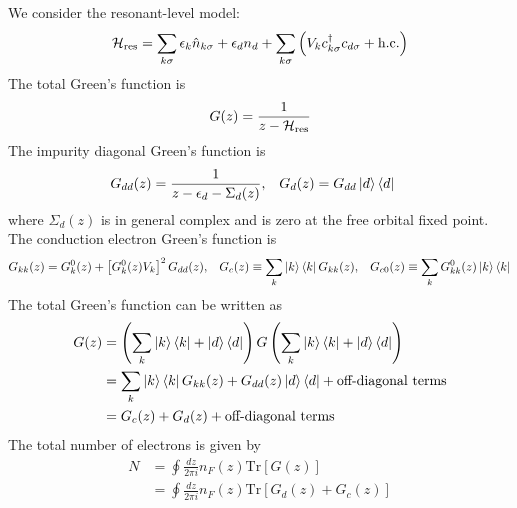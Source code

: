\documentclass[12pt,twoside]{report}
\numberwithin{equation}{section}
\begin{document}
We consider the resonant-level model:
\begin{equation}\begin{aligned}
	\mathcal{H}_\text{res} = \sum_{k\sigma}\epsilon_k \hat n_{k\sigma} + \epsilon_d n_d + \sum_{k\sigma}\left(V_k c^\dagger_{k\sigma} c_{d\sigma} + \text{h.c.}\right)
\end{aligned}\end{equation}
The total Green's function is 
\begin{equation}\begin{aligned}
	G(z) = \frac{1}{z - \mathcal{H}_\text{res}}
\end{aligned}\end{equation}
The impurity diagonal Green's function is
\begin{equation}\begin{aligned}
	G_{dd}(z) &= \frac{1}{z - \epsilon_d - \Sigma_d(z)}, &&	G_d(z) = G_{dd}\ket{d}\bra{d}
\end{aligned}\end{equation}
where \(\Sigma_d(z)\) is in general complex and is zero at the free orbital fixed point. The conduction electron Green's function is 
\begin{equation}\begin{aligned}
	&G_{kk}(z) = G_k^0(z) + \left[G_k^0(z)V_k\right]^2 G_{dd}(z), & G_c(z) \equiv \sum_k \ket{k}\bra{k}G_{kk}(z), && G_{c0}(z) \equiv \sum_k G_{kk}^0(z)\ket{k}\bra{k}
\end{aligned}\end{equation}
The total Green's function can be written as
\begin{equation}\begin{aligned}
	G(z) &= \left(\sum_{k}\ket{k}\bra{k} + \ket{d}\bra{d}\right) G \left(\sum_{k}\ket{k}\bra{k} + \ket{d}\bra{d}\right)\\
	     &= \sum_{k} \ket{k}\bra{k}G_{kk}(z) + G_{dd}(z)\ket{d}\bra{d} + \text{off-diagonal terms}\\
	     &= G_c(z) + G_{d}(z) + \text{off-diagonal terms}
\end{aligned}\end{equation}
The total number of electrons is given by
\begin{equation}\begin{aligned}
	N &= \oint \frac{dz}{2\pi i}n_F(z) \text{Tr}\left[G(z) \right]\\
	  &= \oint \frac{dz}{2\pi i}n_F(z) \text{Tr}\left[G_{d}(z) + G_c(z)\right]
\end{aligned}\end{equation}
\end{document}

